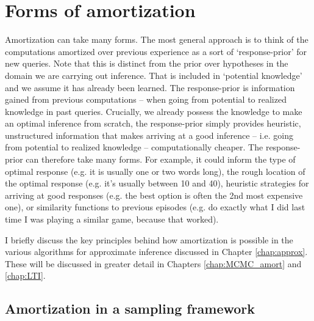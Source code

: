 
\section{Forms of amortization}

Amortization can take many forms. The most general approach is to think of the computations amortized over previous experience as a sort of `response-prior' for new queries. Note that this is distinct from the prior over hypotheses in the domain we are carrying out inference. That is included in `potential knowledge' and we assume it has already been learned. The response-prior is information gained from previous computations -- when going from potential to realized knowledge in past queries. Crucially, we already possess the knowledge to make an optimal inference from scratch, the response-prior simply provides heuristic, unstructured information that makes arriving at a good inference -- i.e. going from potential to realized knowledge -- computationally cheaper. The response-prior can therefore take many forms. For example, it could inform the type of optimal response (e.g. it is usually one or two words long), the rough location of the optimal response (e.g. it's usually between 10 and 40), heuristic strategies for arriving at good responses (e.g. the best option is often the 2nd most expensive one), or similarity functions to previous episodes (e.g. do exactly what I did last time I was playing a similar game, because that worked). 

I briefly discuss the key principles behind how amortization is possible in the various algorithms for approximate inference discussed in Chapter \ref{chap:approx}. These will be discussed in greater detail in Chapters \ref{chap:MCMC_amort} and \ref{chap:LTI}.

\subsection*{Amortization in a sampling framework} 

